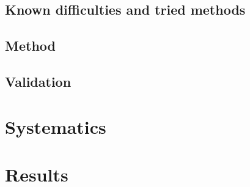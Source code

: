 \subsection{Known difficulties and tried methods}
\label{sec:tried}

\subsection{Method}
\label{sec:bkgmet}

\subsection{Validation}
\label{sec:val}

\section{Systematics}
\label{sec:sys}

\section{Results}
\label{sec:res}

